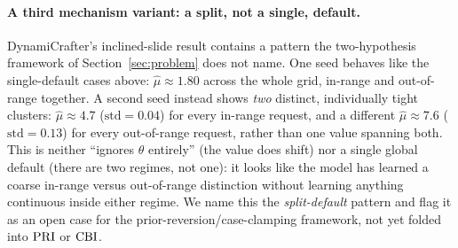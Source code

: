 \documentclass[10pt,twocolumn,letterpaper]{article}
\begin{document}
\begin{center}
\renewcommand{\arraystretch}{1.15}
\label{tab:e4}
\end{center}

\paragraph{A third mechanism variant: a split, not a single, default.}
DynamiCrafter's inclined-slide result contains a pattern the two-hypothesis
framework of Section~\ref{sec:problem} does not name. One seed behaves like
the single-default cases above: $\hat\mu\approx1.80$ across the whole grid,
in-range and out-of-range together. A second seed instead shows \emph{two}
distinct, individually tight clusters: $\hat\mu\approx4.7$
($\mathrm{std}=0.04$) for every in-range request, and a different
$\hat\mu\approx7.6$ ($\mathrm{std}=0.13$) for every out-of-range request,
rather than one value spanning both. This is neither ``ignores $\theta$
entirely'' (the value does shift) nor a single global default (there are two
regimes, not one): it looks like the model has learned a coarse in-range
versus out-of-range distinction without learning anything continuous inside
either regime. We name this the \emph{split-default} pattern and flag it as
an open case for the prior-reversion/case-clamping framework, not yet folded into $\mathrm{PRI}$ or $\mathrm{CBI}$.
\end{document}
